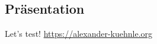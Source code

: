 \subsection{Präsentation}

\begin{frame}{\insertsectionhead}
  \begin{block}{\centering Let's test!}
    \centering\href{https://alexander-kuehnle.org}{https://alexander-kuehnle.org}
  \end{block}
\end{frame}
